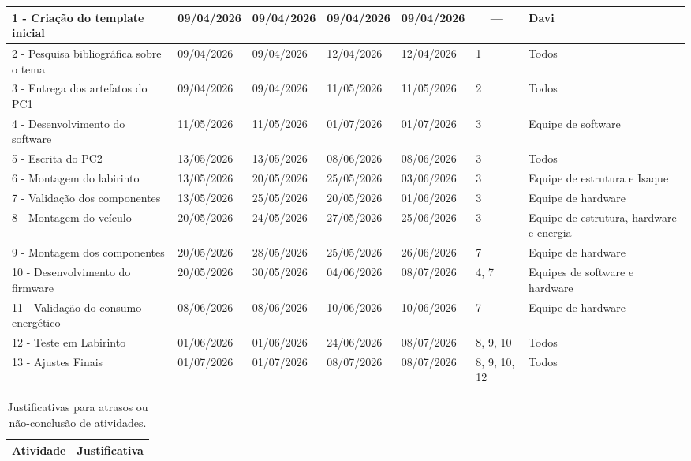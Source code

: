 \begin{landscape}
\begin{longtable}{|p{4cm}|p{2cm}|p{2cm}|p{2cm}|p{2cm}|p{2.5cm}|p{3.5cm}|}
    1 - Criação do template inicial & 09/04/2026 & 09/04/2026 & 09/04/2026 & 09/04/2026 & \multicolumn{1}{c|}{\textbf{---}} & Davi \\ \hline
    2 - Pesquisa bibliográfica sobre o tema & 09/04/2026 & 09/04/2026 & 12/04/2026 & 12/04/2026 & 1 & Todos \\ \hline
    3 - Entrega dos artefatos do PC1 & 09/04/2026 & 09/04/2026 & 11/05/2026 & 11/05/2026 & 2 & Todos \\ \hline
    4 - Desenvolvimento do software & 11/05/2026 & 11/05/2026 & 01/07/2026 & 01/07/2026 & 3 & Equipe de software \\ \hline
    5 - Escrita do PC2 & 13/05/2026 & 13/05/2026 & 08/06/2026 & 08/06/2026 & 3 & Todos \\ \hline   
    6 - Montagem do labirinto & 13/05/2026 & 20/05/2026 & 25/05/2026 & 03/06/2026 & 3 & Equipe de estrutura e Isaque \\ \hline
    7 - Validação dos componentes & 13/05/2026 & 25/05/2026 & 20/05/2026 & 01/06/2026 & 3 & Equipe de hardware \\ \hline
    8 - Montagem do veículo & 20/05/2026 & 24/05/2026 & 27/05/2026 & 25/06/2026 & 3 & Equipe de estrutura, hardware e energia \\ \hline
    9 - Montagem dos componentes & 20/05/2026 & 28/05/2026 & 25/05/2026 & 26/06/2026 & 7 & Equipe de hardware \\ \hline
    10 - Desenvolvimento do firmware & 20/05/2026 & 30/05/2026 & 04/06/2026 & 08/07/2026 & 4, 7 & Equipes de software e hardware \\ \hline
    11 - Validação do consumo energético & 08/06/2026 & 08/06/2026 & 10/06/2026 & 10/06/2026 & 7 & Equipe de hardware \\ \hline
    12 - Teste em Labirinto & 01/06/2026 & 01/06/2026 & 24/06/2026 & 08/07/2026 & 8, 9, 10 & Todos \\ \hline
    13 - Ajustes Finais & 01/07/2026 & 01/07/2026 & 08/07/2026 & 08/07/2026 & 8, 9, 10, 12 & Todos \\ \hline
\end{longtable}

\vspace{1cm}

\begin{longtable}{|c|p{12cm}|}
    \caption{Justificativas para atrasos ou não-conclusão de atividades.} \\
    \hline
    \textbf{Atividade} & \textbf{Justificativa} \\ \hline
    \endfirsthead
    

\end{longtable}
\end{landscape}

